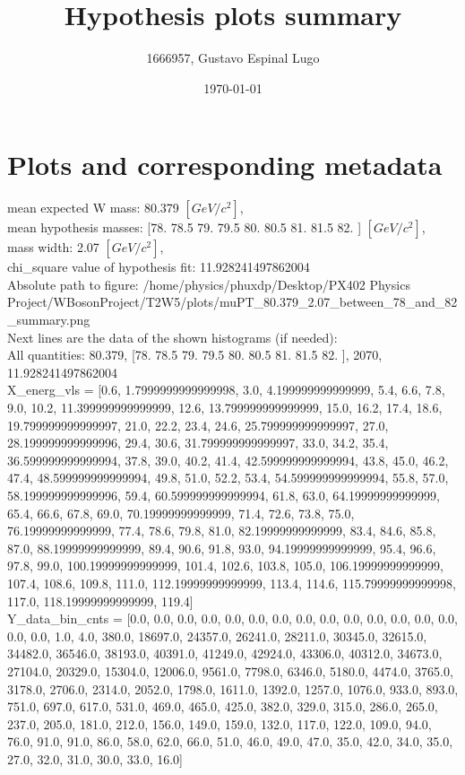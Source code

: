 \documentclass[12pt]{article}
\begin{document}
	\title{Hypothesis plots summary} %
	\author{1666957, Gustavo Espinal Lugo}
	\date{\today} %

	\maketitle
	
	\section*{Plots and corresponding metadata}
	mean expected W mass: 80.379 $[GeV/c^{2}]$,\\
mean hypothesis masses: [78.  78.5 79.  79.5 80.  80.5 81.  81.5 82. ] $[GeV/c^{2}]$,\\
mass width: 2.07 $[GeV/c^{2}]$,\\
chi\_square value of hypothesis fit: 11.928241497862004\\
	Absolute path to figure: /home/physics/phuxdp/Desktop/PX402 Physics Project/WBosonProject/T2W5/plots/muPT\_80.379\_2.07\_between\_78\_and\_82\_summary.png\\
	Next lines are the data of the shown histograms (if needed): \\
	All quantities: 	80.379, [78.  78.5 79.  79.5 80.  80.5 81.  81.5 82. ], 2070, 11.928241497862004\\
	X\_energ\_vls = [0.6, 1.7999999999999998, 3.0, 4.199999999999999, 5.4, 6.6, 7.8, 9.0, 10.2, 11.399999999999999, 12.6, 13.799999999999999, 15.0, 16.2, 17.4, 18.6, 19.799999999999997, 21.0, 22.2, 23.4, 24.6, 25.799999999999997, 27.0, 28.199999999999996, 29.4, 30.6, 31.799999999999997, 33.0, 34.2, 35.4, 36.599999999999994, 37.8, 39.0, 40.2, 41.4, 42.599999999999994, 43.8, 45.0, 46.2, 47.4, 48.599999999999994, 49.8, 51.0, 52.2, 53.4, 54.599999999999994, 55.8, 57.0, 58.199999999999996, 59.4, 60.599999999999994, 61.8, 63.0, 64.19999999999999, 65.4, 66.6, 67.8, 69.0, 70.19999999999999, 71.4, 72.6, 73.8, 75.0, 76.19999999999999, 77.4, 78.6, 79.8, 81.0, 82.19999999999999, 83.4, 84.6, 85.8, 87.0, 88.19999999999999, 89.4, 90.6, 91.8, 93.0, 94.19999999999999, 95.4, 96.6, 97.8, 99.0, 100.19999999999999, 101.4, 102.6, 103.8, 105.0, 106.19999999999999, 107.4, 108.6, 109.8, 111.0, 112.19999999999999, 113.4, 114.6, 115.79999999999998, 117.0, 118.19999999999999, 119.4]\\
	Y\_data\_bin\_cnts = [0.0, 0.0, 0.0, 0.0, 0.0, 0.0, 0.0, 0.0, 0.0, 0.0, 0.0, 0.0, 0.0, 0.0, 0.0, 0.0, 1.0, 4.0, 380.0, 18697.0, 24357.0, 26241.0, 28211.0, 30345.0, 32615.0, 34482.0, 36546.0, 38193.0, 40391.0, 41249.0, 42924.0, 43306.0, 40312.0, 34673.0, 27104.0, 20329.0, 15304.0, 12006.0, 9561.0, 7798.0, 6346.0, 5180.0, 4474.0, 3765.0, 3178.0, 2706.0, 2314.0, 2052.0, 1798.0, 1611.0, 1392.0, 1257.0, 1076.0, 933.0, 893.0, 751.0, 697.0, 617.0, 531.0, 469.0, 465.0, 425.0, 382.0, 329.0, 315.0, 286.0, 265.0, 237.0, 205.0, 181.0, 212.0, 156.0, 149.0, 159.0, 132.0, 117.0, 122.0, 109.0, 94.0, 76.0, 91.0, 91.0, 86.0, 58.0, 62.0, 66.0, 51.0, 46.0, 49.0, 47.0, 35.0, 42.0, 34.0, 35.0, 27.0, 32.0, 31.0, 30.0, 33.0, 16.0]\\
\end{document}
